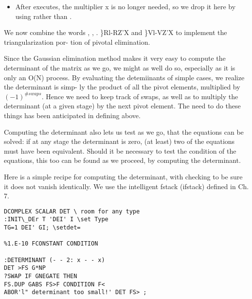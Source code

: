 \begin{itemize}
	\item  After  executes, the multiplier x is no longer needed,
		so we drop it here by using  rather than .
\end{itemize}

We now combine the words , , .
\}Rl-RZ'X and \}Vl-VZ'X to implement the triangularization por-
tion of pivotal elimination.

Since the Gaussian elimination method makes it very easy to
compute the determinant of the matrix as we go, we might as well
do so, especially as it is only an O(N) process. By evaluating the
detemiinants of simple cases, we realize the determinant is simp-
ly the product of all the pivot elements, multiplied by
$(-1)^{\#swaps}$. Hence we need to keep track of swaps, as well as to
multiply the determinant (at a given stage) by the next pivot
element. The need to do these things has been anticipated in
defining  above.

Computing the determinant also lets us test as we go, that the
equations can be solved: if at any stage the determinant is zero,
(at least) two of the equations must have been equivalent. Should
it be necessary to test the condition of the equations, this too
can be found as we proceed, by computing the determinant.

Here is a simple recipe for computing the determinant, with
checking to be sure it does not vanish identically. We use the
intelligent fstack (ifstack) defined in Ch. 7.

\begin{verbatim}
DCOMPLEX SCALAR DET \ room for any type
:INIT\_DEr T 'DEI' I \set Type
TG=1 DEI' GI; \setdet=

%1.E-10 FCONSTANT CONDITION

:DETERMINANT (- - 2: x - - x)
DET >FS G*NP
?SWAP IF GNEGATE THEN
FS.DUP GABS FS>F CONDITION F<
ABOR'l" determinant too small!' DET FS> ;

\end{verbatim} 



